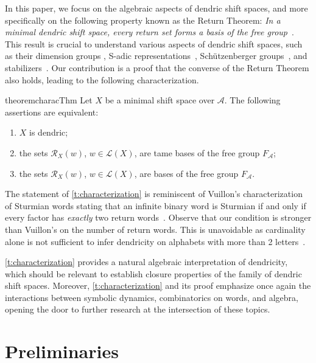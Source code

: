 \documentclass{amsart}
\newcommand*{\ret}{\mathcal{R}}
\newcommand*{\lang}{\mathcal{L}}
\newcommand*{\cA}{\mathcal{A}}
\theoremstyle{plain}
\theoremstyle{definition}
\theoremstyle{remark}
\begin{document}
In this paper, we focus on the algebraic aspects of dendric shift spaces, and more specifically on the following property known as the Return Theorem: \emph{In a minimal dendric shift space, every return set forms a basis of the free group}~\cite{Berthe2015}. This result is crucial to understand various aspects of dendric shift spaces, such as their dimension groups \cite{Berthe2021}, S-adic representations~\cite{Gheeraert2022,pre/Gheeraert2022}, Schützenberger groups~\cite{Almeida2016}, and stabilizers~\cite{Berthe2018}. Our contribution is a proof that the converse of the Return Theorem also holds, leading to the following characterization.

\begin{restatable}{theorem}{characThm}\label{t:characterization}
    Let $X$ be a minimal shift space over $\cA$. The following assertions are equivalent:
    \begin{enumerate}
        \item $X$ is dendric;
        \item the sets $\ret_X(w)$, $w \in \lang(X)$, are tame bases of the free group $F_\cA$;
        \item the sets $\ret_X(w)$, $w \in \lang(X)$, are bases of the free group $F_\cA$.
    \end{enumerate}
\end{restatable}

The statement of \cref{t:characterization} is reminiscent of Vuillon's characterization of Sturmian words stating that an infinite binary word is Sturmian if and only if every factor has \emph{exactly} two return words~\cite{Vuillon2001}. Observe that our condition is stronger than Vuillon's on the number of return words. This is unavoidable as cardinality alone is not sufficient to infer dendricity on alphabets with more than 2 letters~\cite{Balkova2008}.

\cref{t:characterization} provides a natural algebraic interpretation of dendricity, which should be relevant to establish closure properties of the family of dendric shift spaces. Moreover, \cref{t:characterization} and its proof emphasize once again the interactions between symbolic dynamics, combinatorics on words, and algebra, opening the door to further research at the intersection of these topics.

\section{Preliminaries}
\label{s:pre}
\end{document}
